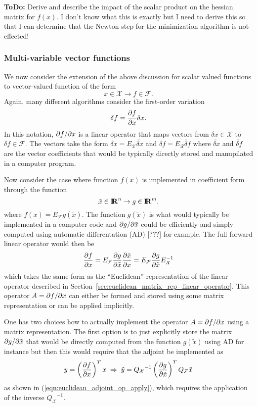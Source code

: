 {}\textbf{ToDo:} Derive and describe the impact of the scalar product on the
hessian matrix for $f(x)$.  I don't know what this is exactly but I need to
derive this so that I can determine that the Newton step for the minimization
algorithm is not effected!

\subsubsection{Multi-variable vector functions}
\label{sec:vector_function_derivatives}

We now consider the extension of the above discussion for scalar valued
functions to vector-valued function of the form
\[
x\in\mathcal{X} \rightarrow f\in\mathcal{F}.
\]
Again, many different algorithms consider the first-order variation
\[
\delta f = \displaystyle{\frac{\partial f}{\partial x}} \delta x.
\]
In this notation, $\partial f / \partial x$ is a linear operator that maps vectors from
$\delta x\in\mathcal{X}$ to $\delta f\in\mathcal{F}$.  The vectors take the
form $\delta x = E_{\mathcal{X}} {}\tilde{\delta x}$ and $\delta f =
E_{\mathcal{R}} {}\tilde{\delta f}$ where ${}\tilde{\delta x}$ and
${}\tilde{\delta f}$ are the vector coefficients that would be typically
directly stored and manupilated in a computer program.

Now consider the case where function $f(x)$ is implemented in coefficient form
through the function
%
\[
\tilde{x}\in\mbox{\textbf{I}}\hspace{-0.6ex}\mbox{\textbf{R}}^n \rightarrow g\in\mbox{\textbf{I}}\hspace{-0.6ex}\mbox{\textbf{R}}^m.
\]
%
where $f(x) = E_{\mathcal{F}} g(\tilde{x})$.  The function $g(\tilde{x})$ is
what would typically be implemented in a computer code and
$\partial g / \partial \tilde{x}$ could be efficiently and simply computed using automatic
differentation (AD) [???] for example.  The full forward linear operator would
then be
%
\begin{equation}
\displaystyle{\frac{\partial f}{\partial x}} = E_{\mathcal{F}} \displaystyle{\frac{\partial g}{\partial \tilde{x}}} \displaystyle{\frac{\partial \tilde{x}}{\partial x}}  = E_{\mathcal{F}} \displaystyle{\frac{\partial g}{\partial \tilde{x}}} E_{\mathcal{X}}^{-1}
\label{eqn:d_f_d_x_euclidean}
\end{equation}
%
which takes the same form as the ``Euclidean'' representation of the linear
operator described in Section~\ref{sec:euclidean_matrix_rep_linear_operator}.
This operator $A = \partial f / \partial x$ can either be formed and stored using some
matrix representation or can be applied implicitly.

One has two choices how to actually implement the operator $A = \partial f / \partial x$
using a matrix representation.  The first option is to just explicitly store
the matrix $\partial g / \partial \tilde{x}$ that would be directly computed from the
function $g(\tilde{x})$ using AD for instance but then this would require that
the adjoint be implemented as
%
\[
y = \left( \displaystyle{\frac{\partial f}{\partial x}} \right)^T x \; \Rightarrow \;
\tilde{y} = {Q_{\mathcal{X}}}^{-1} \left( \displaystyle{\frac{\partial g}{\partial \tilde{x}}} \right)^T Q_{\mathcal{F}} \tilde{x}
\]
%
as shown in (\ref{eqn:euclidean_adjoint_op_apply}), which requires the
application of the inverse ${Q_{\mathcal{X}}}^{-1}$.

